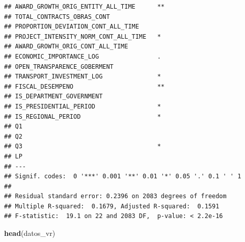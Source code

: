 \documentclass[
]{article}
\newenvironment{Shaded}{\begin{snugshade}}{\end{snugshade}}
\newcommand{\FunctionTok}[1]{\textcolor[rgb]{0.13,0.29,0.53}{\textbf{#1}}}
\newcommand{\NormalTok}[1]{#1}
\begin{document}
\begin{verbatim}
## AWARD_GROWTH_ORIG_ENTITY_ALL_TIME      ** 
## TOTAL_CONTRACTS_OBRAS_CONT                
## PROPORTION_DEVIATION_CONT_ALL_TIME        
## PROJECT_INTENSITY_NORM_CONT_ALL_TIME   *  
## AWARD_GROWTH_ORIG_CONT_ALL_TIME           
## ECONOMIC_IMPORTANCE_LOG                .  
## OPEN_TRANSPARENCE_GOBERMENT               
## TRANSPORT_INVESTMENT_LOG               *  
## FISCAL_DESEMPENO                       ** 
## IS_DEPARTMENT_GOVERNMENT                  
## IS_PRESIDENTIAL_PERIOD                 *  
## IS_REGIONAL_PERIOD                     *  
## Q1                                        
## Q2                                        
## Q3                                     *  
## LP                                        
## ---
## Signif. codes:  0 '***' 0.001 '**' 0.01 '*' 0.05 '.' 0.1 ' ' 1
## 
## Residual standard error: 0.2396 on 2083 degrees of freedom
## Multiple R-squared:  0.1679, Adjusted R-squared:  0.1591 
## F-statistic:  19.1 on 22 and 2083 DF,  p-value: < 2.2e-16
\end{verbatim}

\begin{Shaded}
\begin{Highlighting}[]
\FunctionTok{head}\NormalTok{(datos\_vr)}
\end{Highlighting}
\end{Shaded}
\end{document}
